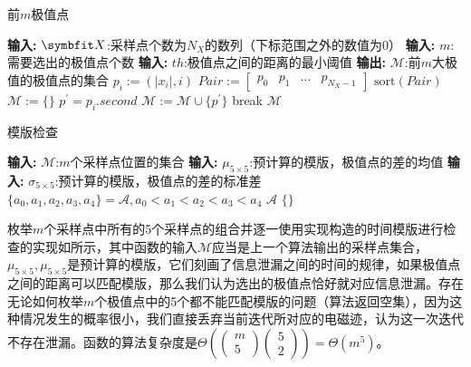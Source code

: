 {	\begin{algorithm}[!h]
		\caption{前$m$极值点}\label{alg:maxpoint}
		\begin{algorithmic}[1]
			\Statex \textbf{输入:} $\Vector X$:采样点个数为$N_X$的数列（下标范围之外的数值为0）
			\Statex \textbf{输入:} $m$:需要选出的极值点个数
			\Statex \textbf{输入:} $th$:极值点之间的距离的最小阈值
			\Statex \textbf{输出:} $\mathcal M$:前$m$大极值的极值点的集合
			\State $p_i:=(\vert x_i\vert,i)$
			\EndFor
			\State $Pair:=\begin{bmatrix}p_0&p_1&\ldots&p_{N_X-1}\end{bmatrix}$
			\State $\mathrm{sort}(Pair)$
			\State $\mathcal M:=\{\}$
			\State $p^\prime=p_i.second$
			\State $\mathcal M:=\mathcal M\cup\{p^\prime\}$
			\State break
			\EndIf
			\EndIf
			\EndFor
			\State \Return $\mathcal M$
		\end{algorithmic}
	\end{algorithm}
	
	\begin{algorithm}[!h]
		\caption{模版检查}\label{alg:checkdelta}
		\begin{algorithmic}[1]
			\Statex \textbf{输入:} $\mathcal M$:$m$个采样点位置的集合
			\Statex \textbf{输入:} $\mu_{5\times5}$:预计算的模版，极值点的差的均值
			\Statex \textbf{输入:} $\sigma_{5\times5}$:预计算的模版，极值点的差的标准差
			\State $\{a_0,a_1,a_2,a_3,a_4\}=\mathcal A,a_0<a_1<a_2<a_3<a_4$
			\State \Return $\mathcal A$
			\EndIf
			\EndIf
			\EndFor
			\State \Return $\{\}$
		\end{algorithmic}
	\end{algorithm}

	枚举$m$个采样点中所有的5个采样点的组合并逐一使用实现构造的时间模版进行检查的实现如所示，其中函数的输入$\mathcal M$应当是上一个算法输出的采样点集合，$\mu_{5\times5},\mu_{5\times5}$是预计算的模版，它们刻画了信息泄漏之间的时间的规律，如果极值点之间的距离可以匹配模版，那么我们认为选出的极值点恰好就对应信息泄漏。存在无论如何枚举$m$个极值点中的5个都不能匹配模版的问题（算法返回空集），因为这种情况发生的概率很小，我们直接丢弃当前迭代所对应的电磁迹，认为这一次迭代不存在泄漏。函数的算法复杂度是$\Theta\left( \begin{pmatrix}m\\5\end{pmatrix}\begin{pmatrix}5\\2\end{pmatrix}\right) =\Theta(m^5)$。
}
